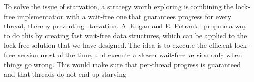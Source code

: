 To solve the issue of starvation, a strategy worth exploring is combining the lock-free implementation with a wait-free one that guarantees progress for every thread, thereby preventing starvation. A. Kogan and E. Petrank~\cite{fast_wait_free} propose a way to do this by creating fast wait-free data structures, which can be applied to the lock-free solution that we have designed. The idea is to execute the efficient lock-free version most of the time, and execute a slower wait-free version only when things go wrong. This would make sure that per-thread progress is guaranteed and that threads do not end up starving.

